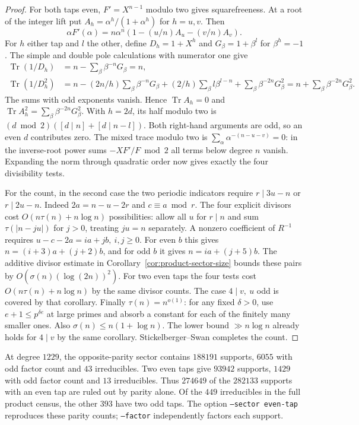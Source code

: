 \documentclass[11pt]{article}
\begin{document}
\begin{proof}
For both taps even, \(F'=X^{n-1}\) modulo two gives squarefreeness.
At a root of the integer lift put \(A_h=\alpha^h/(1+\alpha^h)\)
for \(h=u,v\). Then
\[
 \alpha F'(\alpha)=n\alpha^n(1-(u/n)A_u-(v/n)A_v).
\]
For \(h\) either tap and \(l\) the other, define \(D_h=1+X^h\) and
\(G_\beta=1+\beta^l\) for \(\beta^h=-1\).
The simple and double pole calculations with numerator one give
\begin{align*}
 \operatorname{Tr}(1/D_h)&=n-\sum_\beta\beta^{-n}G_\beta=n,\\
 \operatorname{Tr}(1/D_h^2)&=n-(2n/h)\sum_\beta\beta^{-n}G_\beta
 +(2/h)\sum_\beta l\beta^{l-n}
 +\sum_\beta\beta^{-2n}G_\beta^2
 =n+\sum_\beta\beta^{-2n}G_\beta^2 .
\end{align*}
The sums with odd exponents vanish. Hence \(\operatorname{Tr}A_h=0\)
and \(\operatorname{Tr} A_h^2=\sum_\beta\beta^{-2n}G_\beta^2\).
With \(h=2d\), its half modulo two is
\((d\bmod2)([d\mid n]+[d\mid n-l])\).
Both right-hand arguments are odd, so an even \(d\) contributes zero.
The mixed trace modulo two is \(\sum_\alpha\alpha^{-(n-u-v)}=0\):
in the inverse-root power sums \(-XF'/F\bmod2\) all terms below
degree \(n\) vanish. Expanding the norm through quadratic order now
gives exactly the four divisibility tests.

For the count, in the second case the two periodic indicators
require \(r\mid3u-n\) or \(r\mid2u-n\). Indeed \(2a=n-u-2r\)
and \(c\equiv a\bmod r\). The four explicit divisors cost
\(O(n\tau(n)+n\log n)\) possibilities: allow all \(u\) for \(r\mid n\)
and sum \(\tau(|n-ju|)\) for \(j>0\), treating \(ju=n\) separately.
A nonzero coefficient of \(R^{-1}\) requires
\(u-c-2a=ia+jb,\ i,j\ge0\).
For even \(b\) this gives \(n=(i+3)a+(j+2)b\), and for odd \(b\)
it gives \(n=ia+(j+5)b\).
The additive divisor estimate in Corollary~\ref{cor:product-sector-size}
bounds these pairs by \(O(\sigma(n)(\log(2n))^2)\).
For two even taps the four tests cost \(O(n\tau(n)+n\log n)\) by
the same divisor counts. The case \(4\mid v,\ u\) odd is covered by
that corollary. Finally \(\tau(n)=n^{o(1)}\):
for any fixed \(\delta>0\), use \(e+1\le p^{\delta e}\) at large
primes and absorb a constant for each of the finitely many smaller
ones. Also \(\sigma(n)\le n(1+\log n)\).
The lower bound \(\gg n\log n\) already holds for \(4\mid v\) by
the same corollary. Stickelberger--Swan completes the count.
\end{proof}

At degree \(1229\), the opposite-parity sector contains \(188191\)
supports, \(6055\) with odd factor count and \(43\) irreducibles.
Two even taps give \(93942\) supports, \(1429\) with odd factor count
and \(13\) irreducibles. Thus \(274649\) of the \(282133\) supports
with an even tap are ruled out by parity alone. Of the \(449\)
irreducibles in the full product census, the other \(393\) have two
odd taps. The option \texttt{--sector even-tap} reproduces these
parity counts; \texttt{--factor} independently factors each support.
\end{document}
